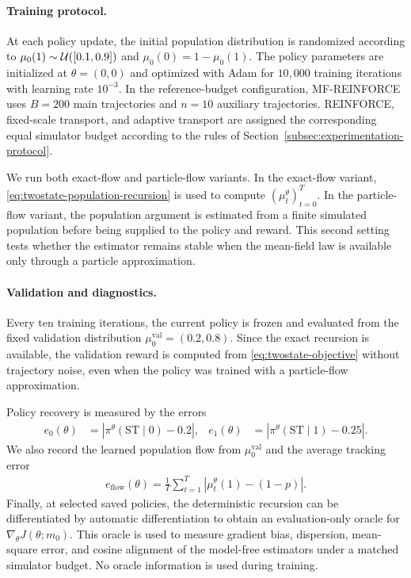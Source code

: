 \paragraph{Training protocol.}
At each policy update, the initial population distribution is randomized according to $\mu_0(1)\sim{\cal U}([0.1,0.9])$ and $\mu_0(0)=1-\mu_0(1)$. The policy parameters are initialized at $\theta=(0,0)$ and optimized with Adam for $10{,}000$ training iterations with learning rate $10^{-3}$. In the reference-budget configuration, MF-REINFORCE uses $B=200$ main trajectories and $n=10$ auxiliary trajectories. REINFORCE, fixed-scale transport, and adaptive transport are assigned the corresponding equal simulator budget according to the rules of Section~\ref{subsec:experimentation-protocol}.

We run both exact-flow and particle-flow variants. In the exact-flow variant, \eqref{eq:twostate-population-recursion} is used to compute $(\mu_t^\theta)_{t=0}^T$. In the particle-flow variant, the population argument is estimated from a finite simulated population before being supplied to the policy and reward. This second setting tests whether the estimator remains stable when the mean-field law is available only through a particle approximation.

\paragraph{Validation and diagnostics.}
Every ten training iterations, the current policy is frozen and evaluated from the fixed validation distribution $\mu_0^\mathrm{val}=(0.2,0.8)$. Since the exact recursion is available, the validation reward is computed from \eqref{eq:twostate-objective} without trajectory noise, even when the policy was trained with a particle-flow approximation.

Policy recovery is measured by the errors
\begin{align}
    e_0(\theta)
    &=
    \left|\pi^\theta(\mathrm{ST}\mid 0)-0.2\right|,
    &
    e_1(\theta)
    &=
    \left|\pi^\theta(\mathrm{ST}\mid 1)-0.25\right|.
\end{align}
We also record the learned population flow from $\mu_0^\mathrm{val}$ and the average tracking error
\begin{align}
    e_{\mathrm{flow}}(\theta)
    =
    \frac1T\sum_{t=1}^{T}
    \left|\mu_t^\theta(1)-(1-p)\right|.
\end{align}
Finally, at selected saved policies, the deterministic recursion can be differentiated by automatic differentiation to obtain an evaluation-only oracle for $\nabla_\theta J(\theta;m_0)$. This oracle is used to measure gradient bias, dispersion, mean-square error, and cosine alignment of the model-free estimators under a matched simulator budget. No oracle information is used during training.


